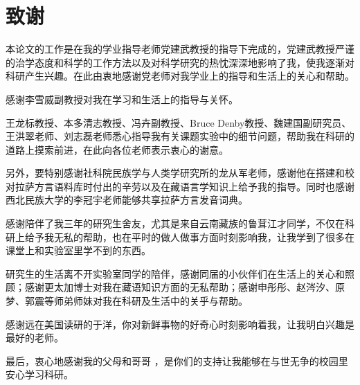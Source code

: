 
\chapter*{致\quad 谢}

\vspace*{1cm}
本论文的工作是在我的学业指导老师党建武教授的指导下完成的，党建武教授严谨的治学态度和科学的工作方法以及对科学研究的热忱深深地影响了我，使我逐渐对科研产生兴趣。在此由衷地感谢党老师对我学业上的指导和生活上的关心和帮助。

感谢李雪威副教授对我在学习和生活上的指导与关怀。

王龙标教授、本多清志教授、冯卉副教授、Bruce Denby教授、魏建国副研究员、王洪翠老师、刘志磊老师悉心指导我有关课题实验中的细节问题，帮助我在科研的道路上摸索前进，在此向各位老师表示衷心的谢意。

另外，要特别感谢社科院民族学与人类学研究所的龙从军老师，感谢他在搭建和校对拉萨方言语料库时付出的辛劳以及在藏语言学知识上给予我的指导。同时也感谢西北民族大学的李冠宇老师能够共享拉萨方言发音词典。

感谢陪伴了我三年的研究生舍友，尤其是来自云南藏族的鲁茸江才同学，不仅在科研上给予我无私的帮助，也在平时的做人做事方面时刻影响我，让我学到了很多在课堂上和实验室里学不到的东西。

研究生的生活离不开实验室同学的陪伴，感谢同届的小伙伴们在生活上的关心和照顾；感谢更太加博士对我在藏语知识方面的无私帮助；感谢申彤彤、赵涔汐、原梦、郭震等师弟师妹对我在科研及生活中的关乎与帮助。

感谢远在美国读研的于洋，你对新鲜事物的好奇心时刻影响着我，让我明白兴趣是最好的老师。

最后，衷心地感谢我的父母和哥哥 ，是你们的支持让我能够在与世无争的校园里安心学习科研。
